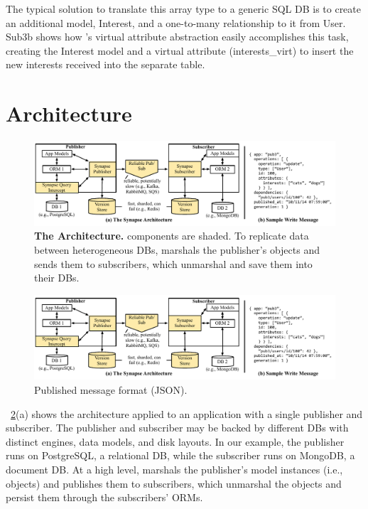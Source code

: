 The typical solution to translate this array type to a generic SQL DB is to create an additional model, Interest, and a one-to-many relationship to it from User.
Sub3b shows how \synapse's virtual attribute abstraction easily accomplishes
this task, creating the Interest model and a virtual
attribute (interests\_virt) to insert the new interests
received into the separate table.


\section{\synapse Architecture}
\label{sec:arch}

\begin{figure}[t]
 \centering
 \includegraphics[width=.9\linewidth,clip=true,trim=0 0.20in 2.2in 0]{figures/synapse/architecture-less-detail.pdf}
 \caption{{{\bf The \synapse Architecture.} \synapse components are shaded.  To
             replicate data between heterogeneous DBs, \synapse marshals the publisher's
             objects and sends them to subscribers, which unmarshal and save them into their DBs.}}
 \label{fig:architecture}
\end{figure}

\begin{figure}[t]
 \centering
 \includegraphics[width=.45\linewidth,clip=true,trim=5in 0.4in 0 0]{figures/synapse/architecture-less-detail.pdf}
 \caption{{Published message format (JSON).}}
 \label{fig:architecture}
\end{figure}

\F~\ref{fig:architecture}(a) shows the \synapse architecture applied to an
application with a single publisher and subscriber. The publisher and subscriber
may be backed by different DBs with distinct engines, data models, and disk
layouts. In our example, the publisher runs on PostgreSQL, a relational DB,
while the subscriber runs on MongoDB, a document DB. At a high level, \synapse
marshals the publisher's model instances (i.e., objects) and publishes them to
subscribers, which unmarshal the objects and persist them through the
subscribers' ORMs.

